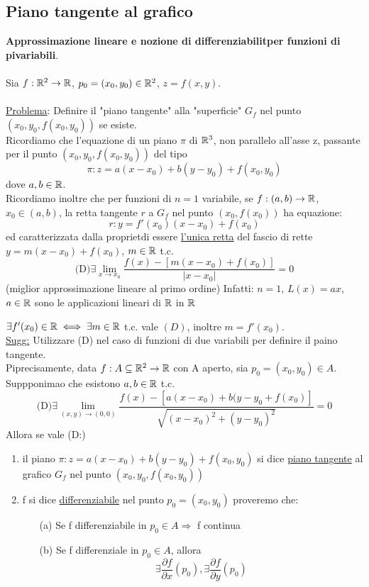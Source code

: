 \subsection{Piano tangente al grafico}
\textbf{Approssimazione lineare e nozione di differenziabilit\aca per funzioni di pi\acu variabili}. \\\\
Sia $f:\mathbb{R}^2 \to \mathbb{R}$, $p_0 = (x_0,y_0) \in \mathbb{R}^2$, $z=f(x,y)$. \\\\
\underline{Problema}: Definire il "piano tangente" alla "superficie" $G_f$ nel punto $(x_0,y_0,f(x_0,y_0))$ se esiste.\\
Ricordiamo che l'equazione di un piano $\pi$ di $\mathbb{R}^3$, non parallelo all'asse z, passante per il punto 
$(x_0,y_0,f(x_0,y_0))$ \ace del tipo 
$$\pi : z = a(x-x_0) + b(y-y_0) + f(x_0,y_0)$$
dove $a,b \in \mathbb{R}$.\\
Ricordiamo inoltre che per funzioni di $n=1$ variabile, se $f:(a,b) \to \mathbb{R}$, $x_0\in (a,b)$, la retta tangente $r$ a 
$G_f$ nel punto $(x_0,f(x_0))$ ha equazione:
$$r: y = f'(x_0)(x-x_0) + f(x_0)$$
ed \ace caratterizzata dalla propriet\aca di essere \underline{l'unica retta} del fascio di rette $y=m(x-x_0)+f(x_0)$, 
$m\in\mathbb{R}$ t.c. 
$$\text{(D)} \exists \lim_{x\to x_0}\frac{f(x)-\left[m(x-x_0)+f(x_0)\right]}{\lvert x-x_0\rvert} = 0$$
(miglior approssimazione lineare al primo ordine)
Infatti: $n=1$, $L(x) = ax$, $a\in\mathbb{R}$ sono le applicazioni lineari di $\mathbb{R}$ in $\mathbb{R}$
\begin{exercise}
  $\exists f'(x_0) \in \mathbb{R} \iff \exists m \in \mathbb{R}$ t.c. vale $(D)$, inoltre $m = f'(x_0)$. \\
  \underline{Sugg:} Utilizzare (D) nel caso di funzioni di due variabili per definire il paino tangente. \\
  Pi\acu precisamente, data $f: A \subseteq \mathbb{R}^2 \to \mathbb{R}$ con A aperto, sia $p_0=(x_0,y_0)\in A$. Suppponimao che esistono $a,b \in \mathbb{R}$ t.c.
  $$\text{(D)} \exists \lim_{(x,y)\to (0,0)}\frac{f(x)-\left[a(x-x_0)+b(y-y_0+f(x_0)\right]}{\sqrt{(x-x_0)^2+(y-y_0)^2}} = 0$$
  Allora se vale (D:)
\end{exercise}
\begin{definition}
  \begin{enumerate}
    \item il piano $\pi : z = a(x-x_0)+b(y-y_0)+f(x_0,y_0)$ si dice \underline{piano tangente} al grafico $G_f$ nel punto $\left(x_0,y_0,f(x_0,y_0)\right)$
    \item f si dice \underline{differenziabile} nel punto $p_0 = (x_0,y_0)$ proveremo che:
      \begin{enumerate}
        \item[(a)] Se f \ace differenziabile in $p_0 \in A \Rightarrow $ f \ace continua
        \item[(b)] Se f \ace differenziale in $p_0 \in A$, allora 
                   $$\exists \frac{\partial f}{\partial x}(p_0), \exists \frac{\partial f}{\partial y}(p_0)$$   
      \end{enumerate}
  \end{enumerate}
\end{definition}
